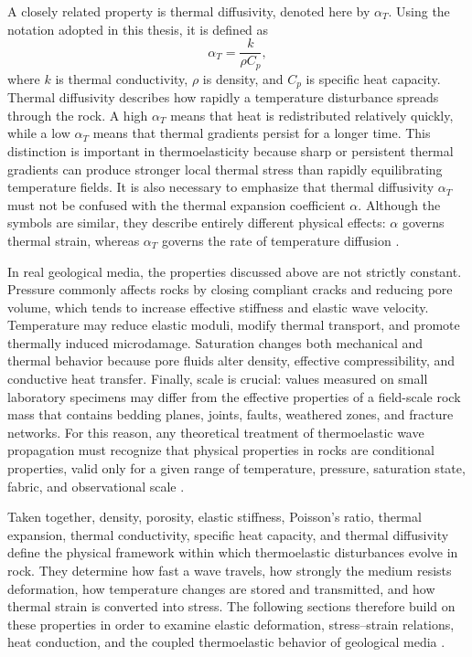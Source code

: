 A closely related property is thermal diffusivity, denoted here by $\alpha_T$. Using the notation adopted in this thesis, it is defined as \[ \alpha_T=\frac{k}{\rho C_p}, \] where $k$ is thermal conductivity, $\rho$ is density, and $C_p$ is specific heat capacity. Thermal diffusivity describes how rapidly a temperature disturbance spreads through the rock. A high $\alpha_T$ means that heat is redistributed relatively quickly, while a low $\alpha_T$ means that thermal gradients persist for a longer time. This distinction is important in thermoelasticity because sharp or persistent thermal gradients can produce stronger local thermal stress than rapidly equilibrating temperature fields. It is also necessary to emphasize that thermal diffusivity $\alpha_T$ must not be confused with the thermal expansion coefficient $\alpha$. Although the symbols are similar, they describe entirely different physical effects: $\alpha$ governs thermal strain, whereas $\alpha_T$ governs the rate of temperature diffusion \cite{robertson1988,turcotte2014}. %

In real geological media, the properties discussed above are not strictly constant. Pressure commonly affects rocks by closing compliant cracks and reducing pore volume, which tends to increase effective stiffness and elastic wave velocity. Temperature may reduce elastic moduli, modify thermal transport, and promote thermally induced microdamage. Saturation changes both mechanical and thermal behavior because pore fluids alter density, effective compressibility, and conductive heat transfer. Finally, scale is crucial: values measured on small laboratory specimens may differ from the effective properties of a field-scale rock mass that contains bedding planes, joints, faults, weathered zones, and fracture networks. For this reason, any theoretical treatment of thermoelastic wave propagation must recognize that physical properties in rocks are conditional properties, valid only for a given range of temperature, pressure, saturation state, fabric, and observational scale \cite{mavko2009,jaeger2007,robertson1988,wolff1982,turcotte2014}. %

Taken together, density, porosity, elastic stiffness, Poisson's ratio, thermal expansion, thermal conductivity, specific heat capacity, and thermal diffusivity define the physical framework within which thermoelastic disturbances evolve in rock. They determine how fast a wave travels, how strongly the medium resists deformation, how temperature changes are stored and transmitted, and how thermal strain is converted into stress. The following sections therefore build on these properties in order to examine elastic deformation, stress--strain relations, heat conduction, and the coupled thermoelastic behavior of geological media \cite{mavko2009,aki2002,jaeger2007,robertson1988}. %